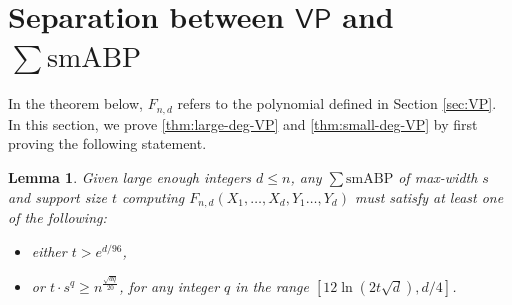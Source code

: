 \documentclass[10pt,a4paper]{article}
\newtheorem{lem}[theorem]{Lemma}
\theoremstyle{definition}%
\theoremstyle{plain}
\newcommand{\sbp}{\sum\mathrm{smABP}}
\newcommand{\VP}{\mathsf{VP}}
\begin{document}
\section{Separation between $\VP$ and $\sbp$}

In the theorem below, $F_{n,d}$ refers to the polynomial defined in Section \ref{sec:VP}. 
In this section, we prove \autoref{thm:large-deg-VP} and \autoref{thm:small-deg-VP} by first proving the following statement. 

\begin{lem}\label{lem:VP}
    Given large enough integers $d\leq n$, any $\sbp$ of max-width $s$ and support size $t$ computing $F_{n,d}(X_1,\ldots,X_d,Y_1\ldots,Y_d)$ must satisfy at least one of the following:
    \begin{itemize}
        \item either $t>e^{d/96}$,
        \item or $t\cdot s^q \geq n^{\frac{\sqrt{dq}}{20}}$, for any integer $q$ in the range $ [12\ln(2t\sqrt{d}), d/4]$.
    \end{itemize}  
\end{lem}
\end{document}
